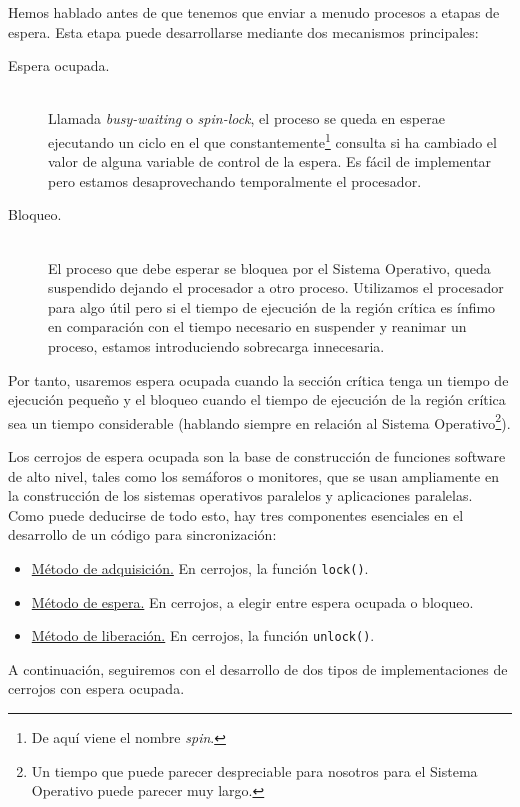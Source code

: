 Hemos hablado antes de que tenemos que enviar a menudo procesos a etapas de espera. Esta etapa puede desarrollarse mediante dos mecanismos principales:
\begin{description}
    \item [Espera ocupada.]~\\
        Llamada \emph{busy-waiting} o \emph{spin-lock}, el proceso se queda en esperae ejecutando un ciclo en el que constantemente\footnote{De aquí viene el nombre \emph{spin}.} consulta si ha cambiado el valor de alguna variable de control de la espera.
        Es fácil de implementar pero estamos desaprovechando temporalmente el procesador.
    \item [Bloqueo.]~\\
        El proceso que debe esperar se bloquea por el Sistema Operativo, queda suspendido dejando el procesador a otro proceso.
        Utilizamos el procesador para algo útil pero si el tiempo de ejecución de la región crítica es ínfimo en comparación con el tiempo necesario en suspender y reanimar un proceso, estamos introduciendo sobrecarga innecesaria.
\end{description}
Por tanto, usaremos espera ocupada cuando la sección crítica tenga un tiempo de ejecución pequeño y el bloqueo cuando el tiempo de ejecución de la región crítica sea un tiempo considerable (hablando siempre en relación al Sistema Operativo\footnote{Un tiempo que puede parecer despreciable para nosotros para el Sistema Operativo puede parecer muy largo.}).

Los cerrojos de espera ocupada son la base de construcción de funciones software de alto nivel, tales como los semáforos o monitores, que se usan ampliamente en la construcción de los sistemas operativos paralelos y aplicaciones paralelas.\\

Como puede deducirse de todo esto, hay tres componentes esenciales en el desarrollo de un código para sincronización:
\begin{itemize}
    \item\ul{Método de adquisición.} En cerrojos, la función \verb|lock()|.
    \item\ul{Método de espera.} En cerrojos, a elegir entre espera ocupada o bloqueo.
    \item\ul{Método de liberación.} En cerrojos, la función \verb|unlock()|.
\end{itemize}
A continuación, seguiremos con el desarrollo de dos tipos de implementaciones de cerrojos con espera ocupada.

